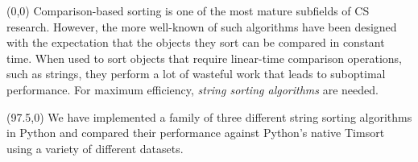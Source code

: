 \begin{textblock}{92.5}(0,0)
\sffamily
\small 
Comparison-based sorting is one of the most mature subfields of CS research.
However, the more well-known of such algorithms have been designed with the
expectation that the objects they sort can be compared in constant time.
When used to sort objects that require linear-time comparison operations,
such as strings, they perform a lot of wasteful work that leads to suboptimal
performance.  For maximum efficiency, \emph{string sorting algorithms} are
needed.
\end{textblock}
\begin{textblock}{92.5}(97.5,0)
  \sffamily \small 
We have implemented a family of three different string sorting algorithms in
Python and compared their performance against Python's native Timsort using
a variety of different datasets.
\end{textblock}

